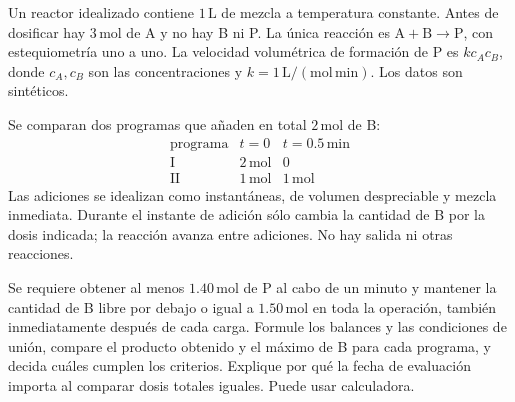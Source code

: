 Un reactor idealizado contiene \(1\,\mathrm L\) de mezcla a temperatura constante. Antes de dosificar hay \(3\,\mathrm{mol}\) de A y no hay B ni P. La única reacción es \(\mathrm{A+B\longrightarrow P}\), con estequiometría uno a uno. La velocidad volumétrica de formación de P es \(k c_Ac_B\), donde \(c_A,c_B\) son las concentraciones y \(k=1\,\mathrm{L/(mol\,min)}\). Los datos son sintéticos.

Se comparan dos programas que añaden en total \(2\,\mathrm{mol}\) de B:
\[
\begin{array}{c|cc}
\text{programa}&t=0&t=0.5\,\mathrm{min}\\\hline
\mathrm I&2\,\mathrm{mol}&0\\
\mathrm{II}&1\,\mathrm{mol}&1\,\mathrm{mol}
\end{array}
\]
Las adiciones se idealizan como instantáneas, de volumen despreciable y mezcla inmediata. Durante el instante de adición sólo cambia la cantidad de B por la dosis indicada; la reacción avanza entre adiciones. No hay salida ni otras reacciones.

Se requiere obtener al menos \(1.40\,\mathrm{mol}\) de P al cabo de un minuto y mantener la cantidad de B libre por debajo o igual a \(1.50\,\mathrm{mol}\) en toda la operación, también inmediatamente después de cada carga. Formule los balances y las condiciones de unión, compare el producto obtenido y el máximo de B para cada programa, y decida cuáles cumplen los criterios. Explique por qué la fecha de evaluación importa al comparar dosis totales iguales. Puede usar calculadora.
